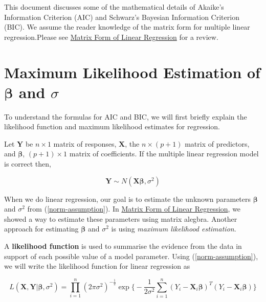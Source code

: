\documentclass[]{book}
\begin{document}
This document discusses some of the mathematical details of Akaike's
Information Criterion (AIC) and Schwarz's Bayesian Information Criterion
(BIC). We assume the reader knowledge of the matrix form for multiple
linear regression.Please see
\href{https://github.com/STA210-Sp19/supplemental-notes/blob/master/regression-basics-matrix.pdf}{Matrix
Form of Linear Regression} for a review.

\section{\texorpdfstring{Maximum Likelihood Estimation of
\(\boldsymbol{\beta}\) and
\(\sigma\)}{Maximum Likelihood Estimation of \textbackslash{}boldsymbol\{\textbackslash{}beta\} and \textbackslash{}sigma}}\label{maximum-likelihood-estimation-of-boldsymbolbeta-and-sigma}

To understand the formulas for AIC and BIC, we will first briefly
explain the likelihood function and maximum likelihood estimates for
regression.

Let \(\mathbf{Y}\) be \(n \times 1\) matrix of responses,
\(\mathbf{X}\), the \(n \times (p+1)\) matrix of predictors, and
\(\boldsymbol{\beta}\), \((p+1) \times 1\) matrix of coefficients. If
the multiple linear regression model is correct then,

\begin{equation}
\label{norm-assumption}
\mathbf{Y} \sim N(\mathbf{X}\boldsymbol{\beta}, \sigma^2)
\end{equation}

When we do linear regression, our goal is to estimate the unknown
parameters \(\boldsymbol{\beta}\) and \(\sigma^2\) from
(\ref{norm-assumption}). In
\href{https://github.com/STA210-Sp19/supplemental-notes/blob/master/regression-basics-matrix.pdf}{Matrix
Form of Linear Regression}, we showed a way to estimate these parameters
using matrix alegbra. Another approach for estimating
\(\boldsymbol{\beta}\) and \(\sigma^2\) is using \emph{maximum
likelihood estimation}.

A \textbf{likelihood function} is used to summarise the evidence from
the data in support of each possible value of a model parameter. Using
(\ref{norm-assumption}), we will write the likelihood function for
linear regression as

\begin{equation}
\label{lr}
L(\mathbf{X}, \mathbf{Y}|\boldsymbol{\beta}, \sigma^2) = \prod\limits_{i=1}^n (2\pi \sigma^2)^{-\frac{1}{2}} \exp\bigg\{-\frac{1}{2\sigma^2}\sum\limits_{i=1}^n(Y_i - \mathbf{X}_i \boldsymbol{\beta})^T(Y_i - \mathbf{X}_i \boldsymbol{\beta})\bigg\}
\end{equation}
\end{document}
